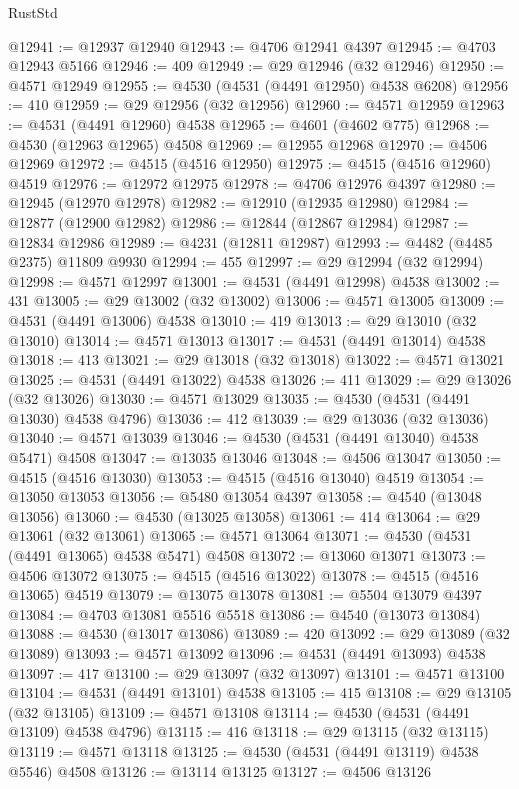 \begin{lexlean}{RustStd}
\begin{coremodule}
@12941 := @12937 @12940
@12943 := @4706 @12941 @4397
@12945 := @4703 @12943 @5166
@12946 := 409
@12949 := @29 @12946 (@32 @12946)
@12950 := @4571 @12949
@12955 := @4530 (@4531 (@4491 @12950) @4538 @6208)
@12956 := 410
@12959 := @29 @12956 (@32 @12956)
@12960 := @4571 @12959
@12963 := @4531 (@4491 @12960) @4538
@12965 := @4601 (@4602 @775)
@12968 := @4530 (@12963 @12965) @4508
@12969 := @12955 @12968
@12970 := @4506 @12969
@12972 := @4515 (@4516 @12950)
@12975 := @4515 (@4516 @12960) @4519
@12976 := @12972 @12975
@12978 := @4706 @12976 @4397
@12980 := @12945 (@12970 @12978)
@12982 := @12910 (@12935 @12980)
@12984 := @12877 (@12900 @12982)
@12986 := @12844 (@12867 @12984)
@12987 := @12834 @12986
@12989 := @4231 (@12811 @12987)
@12993 := @4482 (@4485 @2375) @11809 @9930
@12994 := 455
@12997 := @29 @12994 (@32 @12994)
@12998 := @4571 @12997
@13001 := @4531 (@4491 @12998) @4538
@13002 := 431
@13005 := @29 @13002 (@32 @13002)
@13006 := @4571 @13005
@13009 := @4531 (@4491 @13006) @4538
@13010 := 419
@13013 := @29 @13010 (@32 @13010)
@13014 := @4571 @13013
@13017 := @4531 (@4491 @13014) @4538
@13018 := 413
@13021 := @29 @13018 (@32 @13018)
@13022 := @4571 @13021
@13025 := @4531 (@4491 @13022) @4538
@13026 := 411
@13029 := @29 @13026 (@32 @13026)
@13030 := @4571 @13029
@13035 := @4530 (@4531 (@4491 @13030) @4538 @4796)
@13036 := 412
@13039 := @29 @13036 (@32 @13036)
@13040 := @4571 @13039
@13046 := @4530 (@4531 (@4491 @13040) @4538 @5471) @4508
@13047 := @13035 @13046
@13048 := @4506 @13047
@13050 := @4515 (@4516 @13030)
@13053 := @4515 (@4516 @13040) @4519
@13054 := @13050 @13053
@13056 := @5480 @13054 @4397
@13058 := @4540 (@13048 @13056)
@13060 := @4530 (@13025 @13058)
@13061 := 414
@13064 := @29 @13061 (@32 @13061)
@13065 := @4571 @13064
@13071 := @4530 (@4531 (@4491 @13065) @4538 @5471) @4508
@13072 := @13060 @13071
@13073 := @4506 @13072
@13075 := @4515 (@4516 @13022)
@13078 := @4515 (@4516 @13065) @4519
@13079 := @13075 @13078
@13081 := @5504 @13079 @4397
@13084 := @4703 @13081 @5516 @5518
@13086 := @4540 (@13073 @13084)
@13088 := @4530 (@13017 @13086)
@13089 := 420
@13092 := @29 @13089 (@32 @13089)
@13093 := @4571 @13092
@13096 := @4531 (@4491 @13093) @4538
@13097 := 417
@13100 := @29 @13097 (@32 @13097)
@13101 := @4571 @13100
@13104 := @4531 (@4491 @13101) @4538
@13105 := 415
@13108 := @29 @13105 (@32 @13105)
@13109 := @4571 @13108
@13114 := @4530 (@4531 (@4491 @13109) @4538 @4796)
@13115 := 416
@13118 := @29 @13115 (@32 @13115)
@13119 := @4571 @13118
@13125 := @4530 (@4531 (@4491 @13119) @4538 @5546) @4508
@13126 := @13114 @13125
@13127 := @4506 @13126

\end{coremodule}
\end{lexlean}
